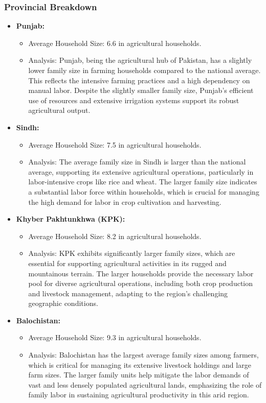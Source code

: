 \documentclass[12pt]{article}
\begin{document}
\subsubsection{Provincial Breakdown}
\begin{itemize}
    \item \textbf{Punjab:}
    \begin{itemize}
        \item Average Household Size: 6.6 in agricultural households.
        \item Analysis: Punjab, being the agricultural hub of Pakistan, has a slightly lower family size in farming households compared to the national average. This reflects the intensive farming practices and a high dependency on manual labor. Despite the slightly smaller family size, Punjab's efficient use of resources and extensive irrigation systems support its robust agricultural output.
    \end{itemize}
    \item \textbf{Sindh:}
    \begin{itemize}
        \item Average Household Size: 7.5 in agricultural households.
        \item Analysis: The average family size in Sindh is larger than the national average, supporting its extensive agricultural operations, particularly in labor-intensive crops like rice and wheat. The larger family size indicates a substantial labor force within households, which is crucial for managing the high demand for labor in crop cultivation and harvesting.
    \end{itemize}
    \item \textbf{Khyber Pakhtunkhwa (KPK):}
    \begin{itemize}
        \item Average Household Size: 8.2 in agricultural households.
        \item Analysis: KPK exhibits significantly larger family sizes, which are essential for supporting agricultural activities in its rugged and mountainous terrain. The larger households provide the necessary labor pool for diverse agricultural operations, including both crop production and livestock management, adapting to the region's challenging geographic conditions.
    \end{itemize}
    \item \textbf{Balochistan:}
    \begin{itemize}
        \item Average Household Size: 9.3 in agricultural households.
        \item Analysis: Balochistan has the largest average family sizes among farmers, which is critical for managing its extensive livestock holdings and large farm sizes. The larger family units help mitigate the labor demands of vast and less densely populated agricultural lands, emphasizing the role of family labor in sustaining agricultural productivity in this arid region.
    \end{itemize}
\end{itemize}
\end{document}
